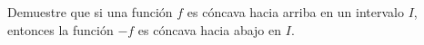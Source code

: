 \item Demuestre que si una función $f$ es cóncava hacia arriba en un intervalo $I$, entonces la función $-f$ es cóncava hacia abajo en $I$.

